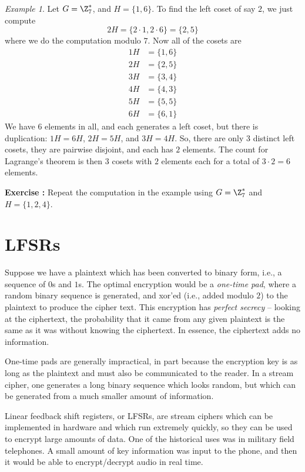 \documentclass[12pt]{amsart}
\newcommand{\terminology}[1]{\textbf{\textit{#1}}}
\renewcommand{\terminology}[1]{#1}
\newcommand{\term}{\terminology}
\newcounter{probs}
\newenvironment{prob}{%
  \refstepcounter{probs}
  \par\medskip\noindent\textbf{Exercise \theprobs:} }{\par\medskip}
\theoremstyle{plain}
\theoremstyle{definition}
\theoremstyle{remark}
\newtheorem*{exam}{Example}
\begin{document}
\begin{exam}
  Let $G=\Z_7^*$, and $H=\{1,6\}$.  To find the left coset of say $2$,
  we just compute
  \[ 2H = \{2\cdot 1, 2\cdot 6\} = \{2, 5\}\]
  where we do the computation modulo $7$.  Now all of the cosets are
  \begin{align*}
    1H &= \{1, 6\} \\
    2H &= \{2, 5\} \\
    3H &= \{3, 4\} \\
    4H &= \{4, 3\} \\
    5H &= \{5, 5\} \\
    6H &= \{6, 1\} 
  \end{align*}
  We have $6$ elements in all, and each generates a left coset, but
  there is duplication: $1H=6H$, $2H=5H$, and $3H=4H$.  So, there are
  only $3$ distinct left cosets, they are pairwise disjoint, and each
  has $2$ elements.  The count for Lagrange's theorem is then $3$
  cosets with $2$ elements each for a total of $3\cdot 2=6$ elements.
\end{exam}
\begin{prob}
  Repeat the computation in the example using $G=\Z_7^*$ and
  $H=\{1,2,4\}$.
\end{prob}


\section{LFSRs} \label{lfsr}
Suppose we have a plaintext which has been
converted to binary form, i.e., a sequence of $0$s and $1$s.  The
optimal encryption would be a {\em one-time pad}, where a random
binary sequence is generated, and xor'ed (i.e., added modulo $2$) to
the plaintext to produce the cipher text. This encryption has {\em
  perfect secrecy} -- looking at the ciphertext, the probability that
it came from any given plaintext is the same as it was without knowing
the ciphertext.  In essence, the ciphertext adds no information.

One-time pads are generally impractical, in part because the
encryption key is as long as the plaintext and must also be
communicated to the reader.  In a stream cipher, one
generates a long binary sequence which looks random, but which can be
generated from a much smaller amount of information.

\term{Linear feedback shift registers}, or LFSRs, are stream ciphers
which can be implemented in hardware and which run extremely quickly,
so they can be used to encrypt large amounts of data.  One of the
historical uses was in military field telephones.  A small amount of
key information was input to the phone, and then it would be able to
encrypt/decrypt audio in real time.
\end{document}
